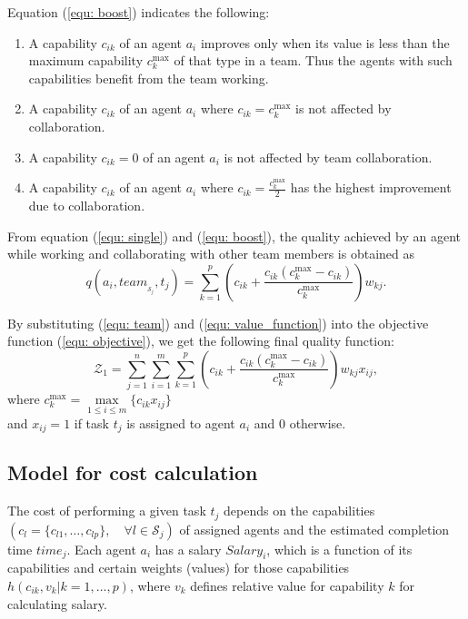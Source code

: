 \documentclass{sig-alternate}
\begin{document}
Equation (\ref{equ: boost}) indicates the following:
\begin{enumerate}
\item A capability $c_{ik}$ of an agent ${a_i}$ improves only when its value is 
  less than the maximum capability $c_k^{\max}$ of that type in a team. 
  Thus the agents with such capabilities benefit from the team working. 
\item A capability $c_{ik}$ of an agent ${a_i}$ where $c_{ik} = c_k^{\max}$ is not 
  affected by collaboration.
\item A capability $c_{ik} = 0$ of an agent ${a_i}$ is not affected by team 
  collaboration.
\item A capability $c_{ik}$ of an agent ${a_i}$ 
  where $c_{ik}=\frac{c_k^{\max}}{2}$ has the highest improvement due to 
  collaboration. 
\end{enumerate}

From equation (\ref{equ: single}) and (\ref{equ: boost}), the quality achieved 
by an agent while working and collaborating with other team members is 
obtained as
\begin{equation}\label{equ: team}
  q(a_i, team_{_{\mathcal{S}_j}}, t_j) = 
  \sum_{k=1}^p (c_{ik} 
  + \frac{c_{ik}(c_k^{\max}-c_{ik})}{c_k^{\max}})w_{kj}. 
\end{equation}

By substituting (\ref{equ: team}) and (\ref{equ: value_function}) 
into the objective function (\ref{equ: objective}), we get the 
following final quality function:  
\begin{equation}\label{equ: objective4}
  \mathcal{Z}_1 = \sum_{j=1}^n\sum_{i=1}^m \sum_{k=1}^p (c_{ik} 
  + \frac{c_{ik}(c_k^{\max}-c_{ik})}{c_k^{\max}})w_{kj}x_{ij}, 
\end{equation}
where $c_k^{\max} = 
\underset{ 1 \leq i \leq m }{\max} \{c_{ik} x_{ij}\}$\\ 
and \mbox{$x_{ij} = 1$} if task $t_j$ is assigned to agent $a_i$ and $0$ 
otherwise.

\subsection{Model for cost calculation}
The cost of performing a given task $t_j$ depends on the capabilities 
$(c_l = \{c_{l1}, \dots, c_{lp}\}, \quad \forall l \in \mathcal{S}_j)$ of 
assigned agents and the estimated completion time $time_j$. 
Each agent $a_i$ has a salary $Salary_i$, which is a function of its 
capabilities and certain weights (values) for those 
capabilities $h(c_{ik}, v_{k}|k=1, \dots, p)$, where $v_{k}$ defines relative 
value for capability $k$ for calculating salary. 
\end{document}
